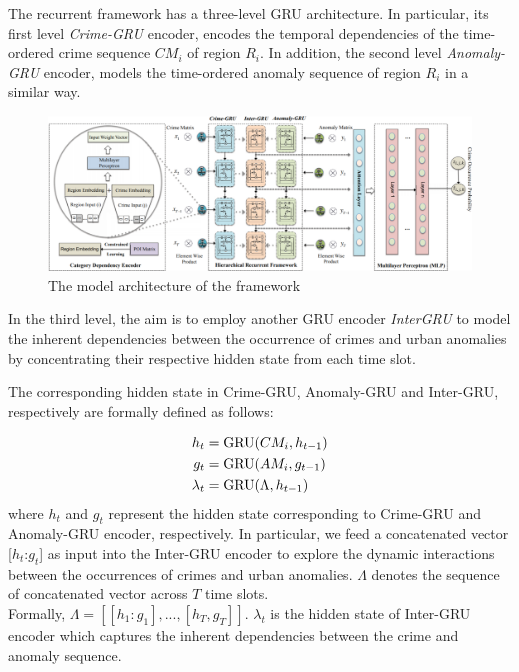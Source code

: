 The recurrent framework has a three-level GRU architecture. In
particular, its first level \emph{Crime-GRU} encoder, encodes the temporal
dependencies of the time-ordered crime sequence $CM_i$ of region $R_i$. In addition, the second level \emph{Anomaly-GRU} encoder, models the
time-ordered anomaly sequence of region $R_i$ in a similar way.
\begin{figure}[t]
	\begin{center}
	\includegraphics[width=.95\textwidth]{Chapter3/Plots_Chapter3/framework.png}
	\caption{The model architecture of the framework}
	\label{fig:framework}
	\end{center}
\end{figure}

In the third level, the aim is to employ another GRU encoder \emph{InterGRU} to model the inherent dependencies between the occurrence
of crimes and urban anomalies by concentrating their respective
hidden state from each time slot.

The corresponding hidden state in Crime-GRU, Anomaly-GRU and Inter-GRU, respectively are formally defined as follows:

\begin{align}
    h_t     &=      \text{GRU}(CM_i,h_{t-1})\notag\\
    g_t     &=      \text{GRU}(AM_i,g_{t-1})\notag\\
    \lambda_t &=    \text{GRU}(\Lambda,h_{t-1})
\end{align}
where $h_t$ and $g_t$ represent the hidden state corresponding to Crime-GRU and Anomaly-GRU encoder, respectively. In particular, we
feed a concatenated vector [$h_t$:$g_t$] as input into the Inter-GRU encoder to explore the dynamic interactions between the occurrences of crimes and urban anomalies. $\Lambda$ denotes the sequence of concatenated vector across $T$ time slots. \\Formally, $\Lambda = [[h_1:g_1],...,[h_T,g_T]]$. $\lambda_t$ is the hidden state of Inter-GRU encoder which captures the inherent dependencies between the crime and anomaly sequence.

